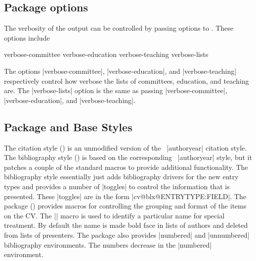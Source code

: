 \documentclass{ltxdockit}[2011/03/25]
\newcommand*{\biblatex}{\sty{biblatex}\xspace}
\begin{document}
\subsection{Package options}
The verbosity of the output can be controlled by passing options to . These options include 
\begin{ltxcode}
verbose-committee
verbose-education
verbose-teaching
verbose-lists
\end{ltxcode}

\noindent The options |verbose-committee|, |verbose-education|, and |verbose-teaching| respectively control how verbose the lists of committees, education, and teaching are. The |verbose-lists| option is the same as passing |verbose-committee|, |verbose-education|, and |verbose-teaching|. 

\subsection{Package and Base Styles}
	The citation style () is an unmodified version of the \biblatex\ |authoryear| citation style. The bibliography style () is based on the corresponding \biblatex\ |authoryear| style, but it patches a couple of the standard macros to provide additional functionality. The bibliography style essentially just adds bibliography drivers for the new entry types and provides a number of |toggles| to control the information that is presented. These |toggles| are in the form |cv@blx@ENTRYTYPE:FIELD|. The package () provides macros for controlling the grouping and format of the items on the CV. The |\highlightname| macro is used to identify a particular name for special treatment. By default the name is made bold face in lists of authors and deleted from lists of presenters. The package also provides |numbered| and |unnumbered| bibliography environments. The numbers decrease in the |numbered| environment.
\end{document}
